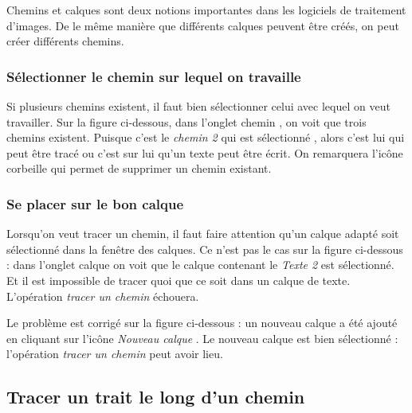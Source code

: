 Chemins et calques sont deux notions importantes dans les logiciels de traitement d'images. De le même manière que différents calques peuvent être créés, on peut créer différents chemins.

\subsubsection{Sélectionner le chemin sur lequel on travaille}

Si plusieurs chemins existent, il faut bien sélectionner celui avec lequel on veut travailler. Sur la figure ci-dessous, dans l'onglet chemin , on voit que trois chemins existent. Puisque c'est le \emph{chemin 2} qui est sélectionné , alors c'est lui qui peut être tracé ou c'est sur lui qu'un texte peut être écrit. On remarquera l'icône corbeille  qui permet de supprimer un chemin existant.  



\subsubsection{Se placer sur le bon calque}

Lorsqu'on veut tracer un chemin, il faut faire attention qu'un calque adapté soit sélectionné dans la fenêtre des calques. Ce n'est pas le cas sur la figure ci-dessous : dans l'onglet calque  on voit que le calque contenant le \emph{Texte 2}  est sélectionné. Et il est impossible de tracer quoi que ce soit dans un calque de texte. L'opération \emph{tracer un chemin} échouera. 


Le problème est corrigé sur la figure ci-dessous : un nouveau calque a été ajouté en cliquant sur l'icône \emph{Nouveau calque} . Le nouveau calque est bien sélectionné  : l'opération \emph{tracer un chemin} peut avoir lieu.  






\subsection{Tracer un trait le long d'un chemin}\label{Gimp3cheminTracer} 

